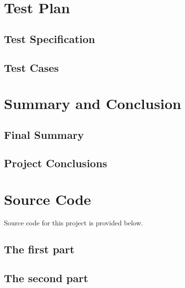 \documentclass[12pt]{article} %
\begin{document}
\section{Test Plan }
%

\subsection{Test Specification}
%
%

\subsection{Test Cases  }
%

\section{Summary and Conclusion}
%

\subsection{Final Summary}


\subsection{Project Conclusions}


\pagebreak
\appendix

\section{Source Code}

Source code for this project is provided below.

\subsection{The first part}
% 

\subsection{The second part}
% 
\end{document}
